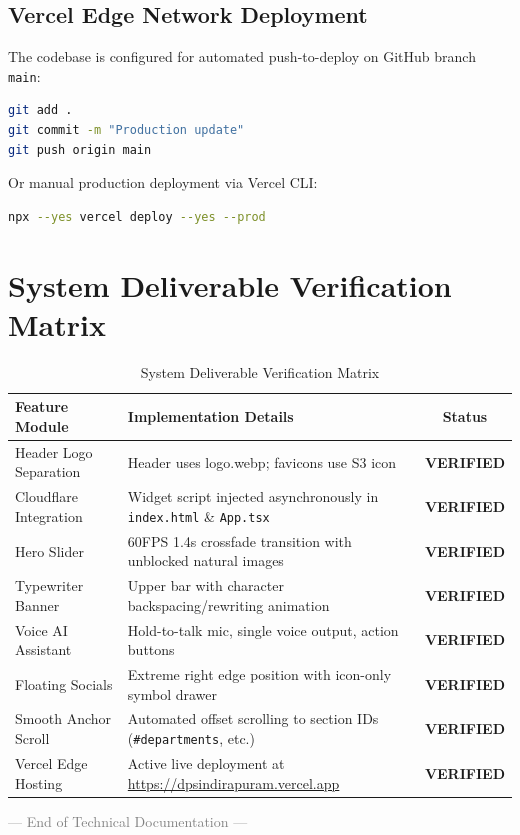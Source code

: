 \documentclass[11pt,a4paper]{article}
\begin{document}
\subsection{Vercel Edge Network Deployment}
The codebase is configured for automated push-to-deploy on GitHub branch \texttt{main}:
\begin{lstlisting}[language=bash]
git add .
git commit -m "Production update"
git push origin main
\end{lstlisting}

Or manual production deployment via Vercel CLI:
\begin{lstlisting}[language=bash]
npx --yes vercel deploy --yes --prod
\end{lstlisting}

\section{System Deliverable Verification Matrix}

\begin{table}[h!]
\centering
\caption{System Deliverable Verification Matrix}
\vspace{0.2cm}
\begin{tabular}{@{}llc@{}}
\toprule
\textbf{Feature Module} & \textbf{Implementation Details} & \textbf{Status} \\ \midrule
Header Logo Separation & Header uses logo.webp; favicons use S3 icon & \textcolor{dpsemerald}{\textbf{VERIFIED}} \\
Cloudflare Integration & Widget script injected asynchronously in \texttt{index.html} \& \texttt{App.tsx} & \textcolor{dpsemerald}{\textbf{VERIFIED}} \\
Hero Slider & 60FPS 1.4s crossfade transition with unblocked natural images & \textcolor{dpsemerald}{\textbf{VERIFIED}} \\
Typewriter Banner & Upper bar with character backspacing/rewriting animation & \textcolor{dpsemerald}{\textbf{VERIFIED}} \\
Voice AI Assistant & Hold-to-talk mic, single voice output, action buttons & \textcolor{dpsemerald}{\textbf{VERIFIED}} \\
Floating Socials & Extreme right edge position with icon-only symbol drawer & \textcolor{dpsemerald}{\textbf{VERIFIED}} \\
Smooth Anchor Scroll & Automated offset scrolling to section IDs (\texttt{\#departments}, etc.) & \textcolor{dpsemerald}{\textbf{VERIFIED}} \\
Vercel Edge Hosting & Active live deployment at \url{https://dpsindirapuram.vercel.app} & \textcolor{dpsemerald}{\textbf{VERIFIED}} \\ \bottomrule
\end{tabular}
\end{table}

\vspace{1cm}
\begin{center}
    \textcolor{gray}{\small --- End of Technical Documentation ---}
\end{center}
\end{document}
